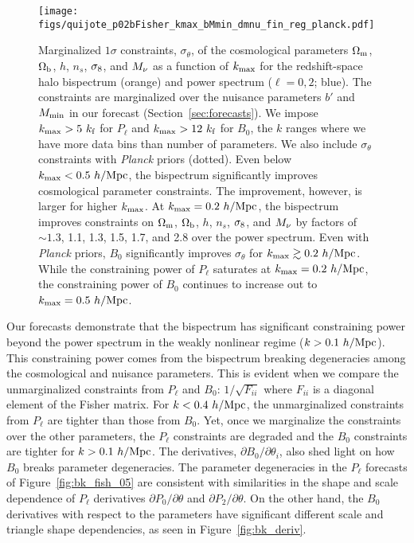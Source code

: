 \begin{figure}
\begin{center}
    \texttt{[image: figs/quijote\_p02bFisher\_kmax\_bMmin\_dmnu\_fin\_reg\_planck.pdf]} 
    \caption{Marginalized $1\sigma$ constraints, $\sigma_\theta$, of the cosmological 
    parameters $\Omega_{\rm m}$, $\Omega_{\rm b}$, $h$, $n_s$, $\sigma_8$, and $M_\nu$ as a function 
    of $k_{\rm max}$ for the redshift-space halo bispectrum (orange) and power 
    spectrum ($\ell = 0, 2$; blue). The constraints are marginalized over the nuisance parameters 
    $b'$ and $M_{\rm min}$ in our forecast (Section~\ref{sec:forecasts}). We impose 
    $k_{\rm max} > 5~k_{\rm f}$ for $P_\ell$ and $k_{\rm max} > 12~k_{\rm f}$ 
    for $B_0$, the $k$ ranges where we have more data bins than number of parameters. 
    We also include $\sigma_\theta$ constraints with {\em Planck} priors (dotted). 
    Even below $k_{\rm max} < 0.5~h/{\rm Mpc}$, the bispectrum significantly 
    improves cosmological parameter constraints. The improvement, however, is larger 
    for higher $k_{\rm max}$. At $k_{\rm max} = 0.2~h/{\rm Mpc}$, the bispectrum 
    improves constraints on $\Omega_{\rm m}$, $\Omega_{\rm b}$, $h$, $n_s$, $\sigma_8$, and $M_\nu$ by factors 
    of $\sim 1.3$, 1.1, 1.3, 1.5, 1.7, and 2.8 over the power spectrum. Even with 
    {\em Planck} priors, $B_0$ significantly improves $\sigma_\theta$ for $k_{\rm max} \gtrsim 0.2~h/{\rm Mpc}$. 
    While the constraining power of $P_\ell$ saturates at $k_{\rm max} = 0.2~h/{\rm Mpc}$,
    the constraining power of $B_0$ continues to increase out to $k_{\rm max} = 0.5~h/{\rm Mpc}$.}
\label{fig:fish_kmax}
\end{center}
\end{figure}
Our forecasts demonstrate that the bispectrum has significant constraining power 
beyond the power spectrum in the weakly nonlinear regime ($k > 0.1~h/{\rm Mpc}$). 
This constraining power 
comes from the bispectrum breaking degeneracies among the cosmological and 
nuisance parameters. This is evident when we compare the unmarginalized 
constraints from $P_\ell$ and $B_0$: $1/\sqrt{F_{ii}}$ where $F_{ii}$ is a 
diagonal element of the Fisher matrix. For $k < 0.4~h/{\rm Mpc}$, the unmarginalized 
constraints from $P_\ell$ are tighter than those from $B_0$. Yet, once we 
marginalize the constraints over the other parameters, the $P_\ell$ constraints 
are degraded and the $B_0$ constraints are tighter for $k > 0.1~h/{\rm Mpc}$. The derivatives, 
$\partial B_0/\partial \theta_i$, also shed light on how $B_0$ breaks parameter 
degeneracies. The parameter degeneracies in the $P_\ell$ forecasts of Figure~\ref{fig:bk_fish_05} 
are consistent with similarities in the shape and scale dependence of 
$P_\ell$ derivatives $\partial P_0/\partial \theta$ and $\partial P_2/\partial \theta$. 
On the other hand, the $B_0$ derivatives with respect to the parameters 
have significant different scale and triangle shape dependencies, as seen 
in Figure~\ref{fig:bk_deriv}.

